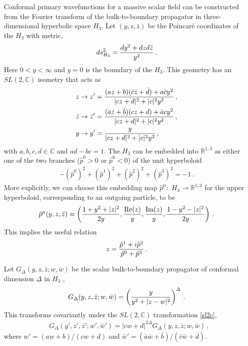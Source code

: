 \documentclass[12pt]{article}
\numberwithin{equation}{section}
\begin{document}
Conformal primary wavefunctions for a massive scalar field can be constructed from the Fourier transform of the bulk-to-boundary propagator in three-dimensional hyperbolic space $H_3$. Let $(y,z,\bar z)$ be the  Poincar\'e coordinates of the $H_3$ with metric,
\begin{align}\label{ads3metric}
ds_{H_3}^2 = {dy^2 +dzd\bar z\over y^2}\,.
\end{align}
Here $0<y<\infty$ and  $y=0$ is the  boundary of the $H_3$.  This geometry  has an $SL(2,\mathbb{C})$ isometry that acts as
\begin{align}\label{sl2c}
&z\to z' = {(az+b)(\bar c\bar z +\bar d )+a\bar cy^2 \over|cz+d|^2+|c|^2y^2 } \,,\notag\\
&\bar z\to \bar z' = {(\bar a\bar z+\bar b)(c z + d )+\bar a cy^2 \over|cz+d|^2+| c|^2y^2 } \,,\notag\\
&y\to y' = {y\over |cz+d|^2+|c|^2y^2}\,,
\end{align}
with $a,b,c,d\in \mathbb{C}$ and $ad-bc =1$.  The $H_3$  can be embedded into $\mathbb{R}^{1,3}$ as either one of the two branches ($\hat p^0>0$ or $\hat p^0<0$) of the unit hyperboloid
\begin{align}\label{hyperboloid}
 -(\hat p^0)^2 + (\hat p^1)^2+(\hat p^2)^2+(\hat p^3)^2=-1\,.
\end{align}
 More explicitly, we can choose this embedding map $\hat p^\mu:$ $H_3$$\to \mathbb{R}^{1,3}$  for the upper hyperboloid, corresponding to an outgoing particle,  to be
\begin{align}\label{map}
\hat p^\mu(y,z,\bar z) = \left({  1+y^2+|z|^2 \over 2y}  ,  {\text{Re} (z)\over y}, {\text{Im} (z)\over y}, {1-y^2-|z|^2\over 2y}    \right)\,.
\end{align}
This implies the useful relation
\begin{equation}z={\hat p^1+i\hat p^2 \over\hat p^0+\hat p^3}\,.\end{equation}



Let $G_\Delta(y,z,\bar z; w,\bar w)$ be the scalar bulk-to-boundary propagator of conformal dimension $\Delta$ in $H_3$ \cite{Witten:1998qj}, 
\begin{align}
G_\Delta (y, z,\bar z; w,\bar w) =  \left({ y\over y^2  +  |z-w|^2}\right)^\Delta\,.
\end{align}
This transforms covariantly  under the $SL(2,\mathbb{C})$ transformation \eqref{sl2c},
\begin{align}\label{covariance}
&G_\Delta(y',z',\bar z'; w' ,\bar w') = |cw+d|^{2\Delta} G_\Delta(y,z,\bar z; w,\bar w)\,,
\end{align}
where $w' = (aw+b)/(cw+d)$ and $\bar w'  = (\bar a\bar w +\bar b)/(\bar c \bar w +\bar d)$.
\end{document}
